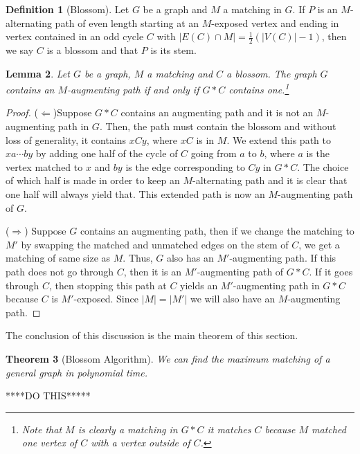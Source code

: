 \documentclass{tufte-handout}
\newtheorem{thm}{Theorem}
\newtheorem{lem}[thm]{Lemma}
\theoremstyle{definition}
\newtheorem{defn}[thm]{Definition}
\theoremstyle{remark}
\begin{document}
\begin{defn}[Blossom]
	Let $G$ be a graph and $M$ a matching in $G$. If $P$ is an $M$-alternating path of even length starting at an $M$-exposed vertex and ending in vertex contained in an odd cycle $C$ with $|E(C) \cap M| = \frac{1}{2}(|V(C)|-1)$, then we say $C$ is a blossom and that $P$ is its stem.
\end{defn}
\begin{lem}
	Let $G$ be a graph, $M$ a matching and $C$ a blossom. The graph $G$ contains an $M$-augmenting path if and only if $G*C$ contains one.\footnote{Note that $M$ is clearly a matching in $G*C$ it matches $C$ because $M$ matched one vertex of $C$ with a vertex outside of $C$.}
\end{lem}
\begin{proof}
	($\Leftarrow$)Suppose $G*C$ contains an augmenting path and it is not an $M$-augmenting path in $G$. Then, the path must contain the blossom and without loss of generality, it contains $xCy$, where $xC$ is in $M$. We extend this path to $xa\cdots by$ by adding one half of the cycle of $C$ going from $a$ to $b$, where $a$ is the vertex matched to $x$ and $by$ is the edge corresponding to $Cy$ in $G*C$. The choice of which half is made in order to keep an $M$-alternating path and it is clear that one half will always yield that. This extended path is now an $M$-augmenting path of $G$.
		
	($\Rightarrow$) Suppose $G$ contains an augmenting path, then if we change the matching to $M'$ by swapping the matched and unmatched edges on the stem of $C$, we get a matching of same size as $M$. Thus, $G$ also has an $M'$-augmenting path. If this path does not go through $C$, then it is an $M'$-augmenting path of $G*C$. If it goes through $C$, then stopping this path at $C$ yields an $M'$-augmenting path in $G*C$ because $C$ is $M'$-exposed. Since $|M| = |M'|$ we will also have an $M$-augmenting path.
\end{proof}

The conclusion of this discussion is the main theorem of this section.
\begin{thm}[Blossom Algorithm]
	We can find the maximum matching of a general graph in polynomial time.
\end{thm}
\begin{codebox}
	\li *****DO THIS*****
\end{codebox}
\end{document}
